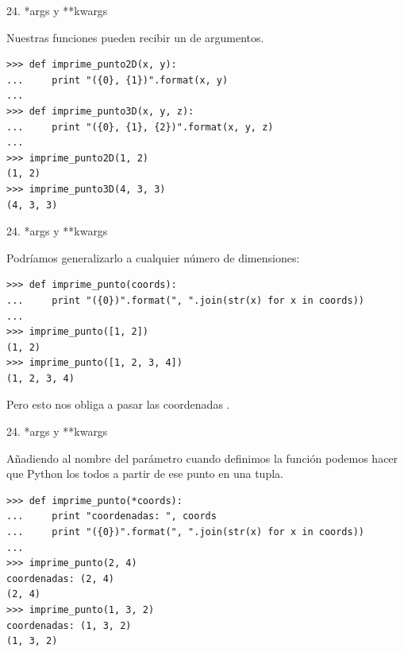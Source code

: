 \documentclass[14pt]{beamer}
\begin{document}
\begin{frame}[fragile]{24. *args y **kwargs}
  \begin{block}{}
    \small
    \centering
    Nuestras funciones pueden recibir un 
    de argumentos.
  \end{block}

  \begin{exampleblock}{}
    \footnotesize
    \begin{lstlisting}
>>> def imprime_punto2D(x, y):
...     print "({0}, {1})".format(x, y)
...
>>> def imprime_punto3D(x, y, z):
...     print "({0}, {1}, {2})".format(x, y, z)
...
>>> imprime_punto2D(1, 2)
(1, 2)
>>> imprime_punto3D(4, 3, 3)
(4, 3, 3)
    \end{lstlisting}
  \end{exampleblock}
\end{frame}

\begin{frame}[fragile]{24. *args y **kwargs}
  \begin{block}{}
    \small
    \centering
    Podríamos generalizarlo a cualquier número de dimensiones:
  \end{block}

  \begin{exampleblock}{}
    \scriptsize
    \begin{lstlisting}
>>> def imprime_punto(coords):
...     print "({0})".format(", ".join(str(x) for x in coords))
...
>>> imprime_punto([1, 2])
(1, 2)
>>> imprime_punto([1, 2, 3, 4])
(1, 2, 3, 4)
    \end{lstlisting}
  \end{exampleblock}

  \begin{alertblock}{}
    \small
    \centering
    Pero esto nos obliga a pasar las coordenadas .
  \end{alertblock}
\end{frame}

\begin{frame}[fragile]{24. *args y **kwargs}
  \begin{block}{}
    \small
    \centering
    Añadiendo  al nombre del parámetro cuando
    definimos la función podemos hacer que Python los
     todos a partir de ese punto en una tupla.
  \end{block}

  \begin{exampleblock}{}
    \scriptsize
    \begin{lstlisting}
>>> def imprime_punto(*coords):
...     print "coordenadas: ", coords
...     print "({0})".format(", ".join(str(x) for x in coords))
...
>>> imprime_punto(2, 4)
coordenadas: (2, 4)
(2, 4)
>>> imprime_punto(1, 3, 2)
coordenadas: (1, 3, 2)
(1, 3, 2)
    \end{lstlisting}
  \end{exampleblock}
\end{frame}
\end{document}
